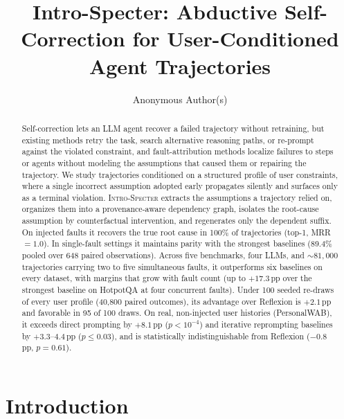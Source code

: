 \documentclass{article}
\title{Intro-Specter: Abductive Self-Correction for User-Conditioned Agent Trajectories}
\author{Anonymous Author(s)}
\newcommand{\method}{\textsc{Intro-Specter}\xspace}
\begin{document}
\maketitle

\begin{abstract}
Self-correction lets an LLM agent recover a failed trajectory without retraining, but existing methods retry the task, search alternative reasoning paths, or re-prompt against the violated constraint, and fault-attribution methods localize failures to steps or agents without modeling the assumptions that caused them or repairing the trajectory. We study trajectories conditioned on a structured profile of user constraints, where a single incorrect assumption adopted early propagates silently and surfaces only as a terminal violation. \method extracts the assumptions a trajectory relied on, organizes them into a provenance-aware dependency graph, isolates the root-cause assumption by counterfactual intervention, and regenerates only the dependent suffix. On injected faults it recovers the true root cause in 100\% of trajectories (top-1, MRR${=}1.0$). In single-fault settings it maintains parity with the strongest baselines (89.4\% pooled over 648 paired observations). Across five benchmarks, four LLMs, and ${\sim}81{,}000$ trajectories carrying two to five simultaneous faults, it outperforms six baselines on every dataset, with margins that grow with fault count (up to $+17.3$\,pp over the strongest baseline on HotpotQA at four concurrent faults). Under 100 seeded re-draws of every user profile (40{,}800 paired outcomes), its advantage over Reflexion is $+2.1$\,pp and favorable in 95 of 100 draws. On real, non-injected user histories (PersonalWAB), it exceeds direct prompting by $+8.1$\,pp ($p<10^{-4}$) and iterative reprompting baselines by $+3.3$--$4.4$\,pp ($p\le0.03$), and is statistically indistinguishable from Reflexion ($-0.8$\,pp, $p=0.61$).
\end{abstract}

\section{Introduction}\label{sec:intro}
\end{document}
